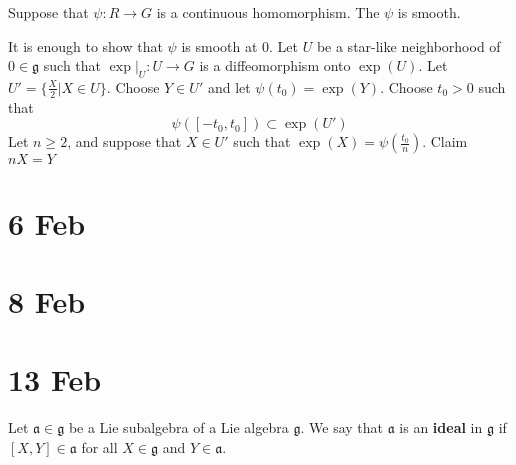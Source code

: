 \documentclass[11pt,a4paper]{scrarticle}
\theoremstyle{definition}
\renewenvironment{proof}[1][\proofname]{\vspace{-10pt}\begin{myproof}}{\end{myproof}}
\theoremstyle{greenbox}
\newcommand{\ag}{\mathfrak{a}}
\newcommand{\fg}{\mathfrak{g}}
\begin{document}
\begin{thm}
    Suppose that $ \psi : R \to G $ is a continuous homomorphism. The $ \psi $ is smooth.
\end{thm}
\begin{proof}
    It is enough to show that $ \psi $ is smooth at $ 0 $. Let $ U $ be a star-like neighborhood of $ 0 \in \fg $ such that $ \exp|_{U}  :U \to G $ is a diffeomorphism onto $ \exp(U) $. Let $ U' = \{\frac{X}{2} | X \in U\} $. Choose $ Y \in U' $ and let $ \psi(t_{0}) = \exp(Y) $. Choose $ t_{0} > 0  $ such that 
    \[ \psi([-t_{0},t_{0}]) \subset \exp(U') \]
    Let $ n \ge 2 $, and suppose that $ X \in U'
     $ such that $ \exp(X) = \psi(  \frac{t_{0}}{n}) $. Claim $ nX = Y $
\end{proof}
\section{6 Feb}
\section{8 Feb}
\section{13 Feb}

\vspace{0.5cm}
\begin{defn}
    Let $ \mathfrak{a} \in \fg $ be a Lie subalgebra of a Lie algebra $ \fg $. We say that $ \ag $ is an \textbf{ideal} in $ \fg $ if $ [X,Y] \in \ag $ for all $ X \in \fg $ and $ Y \in \ag $. 
\end{defn}
\end{document}
